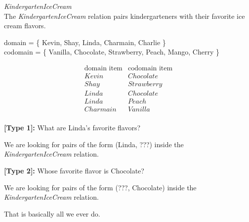 \documentclass{ximera}
\begin{document}
\begin{example} \textit{KindergartenIceCream} \\
The \textit{KindergartenIceCream} relation pairs kindergarteners with their favorite ice cream flavors.

domain = \{ Kevin, Shay, Linda, Charmain, Charlie \}  \\
codomain = \{ Vanilla, Chocolate, Strawberry, Peach, Mango, Cherry \} 

\[
\begin{array}{l|l}
    \text{domain item}      & \text{codomain item}      \\ \hline
    Kevin   &  Chocolate \\
    Shay   & Strawberry \\
    Linda  &  Chocolate \\
    Linda  &  Peach \\
    Charmain &  Vanilla \\ 
\end{array}
\]


\begin{question}
\textbf{[Type 1]:} What are Linda's favorite flavors? 

\begin{selectAll}
\end{selectAll}
\end{question}

We are looking for pairs of the form (Linda, ???) inside the \textit{KindergartenIceCream} relation.


\begin{question}
\textbf{[Type 2]:} Whose favorite flavor is Chocolate? 

\begin{selectAll}

\end{selectAll}
\end{question}

We are looking for pairs of the form (???, Chocolate) inside the \textit{KindergartenIceCream} relation.



\end{example} 

That is basically all we ever do.  \\
\end{document}
